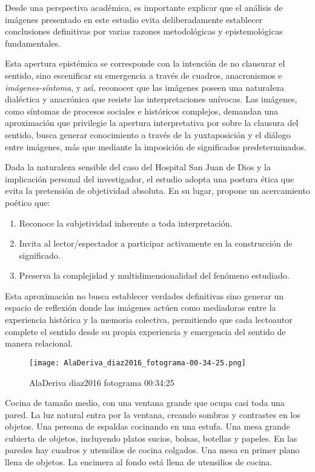 Desde una perspectiva académica, es importante explicar que el análisis de imágenes presentado en este estudio evita deliberadamente establecer conclusiones definitivas por varias razones metodológicas y epistemológicas fundamentales. \textcolor{edit30sept}{Esta apertura epistémica se corresponde con la intención de no clausurar el sentido, sino escenificar su emergencia a través de cuadros, anacronismos e \textit{imágenes-síntoma}, y así, reconocer que las imágenes poseen una naturaleza dialéctica y anacrónica que resiste las interpretaciones unívocas. Las imágenes, como síntomas de procesos sociales e históricos complejos, demandan una aproximación que privilegie la apertura interpretativa por sobre la clausura del sentido, busca generar conocimiento a través de la yuxtaposición y el diálogo entre imágenes, más que mediante la imposición de significados predeterminados.

Dada la naturaleza sensible del caso del Hospital San Juan de Dios y la implicación personal del investigador, el estudio adopta una postura ética que evita la pretensión de objetividad absoluta. En su lugar, propone un acercamiento poético que:

\begin{enumerate}
    \item Reconoce la subjetividad inherente a toda interpretación.
    \item Invita al lector/espectador a participar activamente en la construcción de significado.
    \item Preserva la complejidad y multidimensionalidad del fenómeno estudiado.
\end{enumerate}

Esta aproximación no busca establecer verdades definitivas sino generar un espacio de reflexión donde las imágenes actúen como mediadoras entre la experiencia histórica y la memoria colectiva, permitiendo que cada lectoautor complete el sentido desde su propia experiencia y emergencia del sentido de manera relacional.


\clearpage
\begin{figure}[h!]
    \centering
    \texttt{[image: AlaDeriva\_diaz2016\_fotograma-00-34-25.png]}
    \caption{AlaDeriva diaz2016 fotograma 00:34:25}
    \label{fig:AlaDeriva_diaz2016_fotograma_00_34_25}
\end{figure}

Cocina de tamaño medio, con una ventana grande que ocupa casi toda una pared. La luz natural entra por la ventana, creando sombras y contrastes en los objetos. Una persona de espaldas cocinando en una estufa. Una mesa grande cubierta de objetos, incluyendo platos sucios, bolsas, botellas y papeles. En las paredes hay cuadros y utensilios de cocina colgados. Una mesa en primer plano llena de objetos. La encimera al fondo está llena de utensilios de cocina. \parencite[fotograma: 00:34:25]{AlaDerivaDiaz2016}

}
